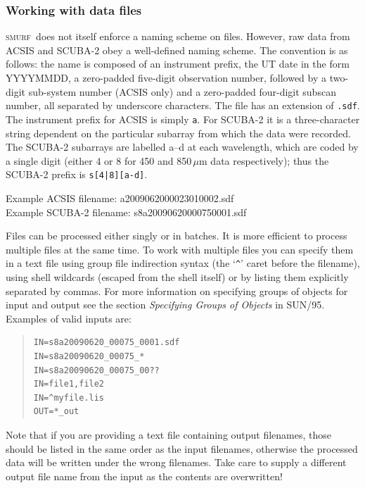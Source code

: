 \documentclass[twoside,11pt]{article}
\newcommand{\xref}[3]{#1}
\newcommand{\xlabel}[1]{}
\renewcommand{\_}{\texttt{\symbol{95}}}
\newenvironment{myquote}{\begin{quote}\begin{small}}{\end{small}\end{quote}}
\newcommand{\SMURF}{\textsc{smurf}}
\begin{document}
\subsubsection{\xlabel{files}Working with data files\label{se:files}}

\SMURF\ does not itself enforce a naming scheme on files. However, raw
data from ACSIS and SCUBA-2 obey a well-defined naming scheme. The
convention is as follows: the name is composed of an instrument
prefix, the UT date in the form YYYYMMDD, a zero-padded five-digit
observation number, followed by a two-digit sub-system number (ACSIS
only) and a zero-padded four-digit subscan number, all separated by
underscore characters. The file has an extension of \verb+.sdf+. The
instrument prefix for ACSIS is simply \verb+a+. For SCUBA-2 it is a
three-character string dependent on the particular subarray from which
the data were recorded. The SCUBA-2 subarrays are labelled a--d at
each wavelength, which are coded by a single digit (either 4 or 8 for
450 and 850\,$\mu$m data respectively); thus the SCUBA-2 prefix is
\verb+s[4|8][a-d]+.

Example ACSIS filename: a20090620\_00023\_01\_0002.sdf\\
Example SCUBA-2 filename: s8a20090620\_00075\_0001.sdf

Files can be processed either singly or in batches. It is more
efficient to process multiple files at the same time. To work with
multiple files you can specify them in a text file using group file
indirection syntax (the `\verb+^+' caret before the filename), using shell
wildcards (escaped from the shell itself) or by listing them
explicitly separated by commas. For more information on specifying
groups of objects for input and output see \xref{the section
  \textit{Specifying Groups of Objects} in
  SUN/95}{sun95}{se_groups}. Examples of valid inputs are:
\begin{myquote}
\begin{verbatim}
IN=s8a20090620_00075_0001.sdf
IN=s8a20090620_00075_*
IN=s8a20090620_00075_00??
IN=file1,file2
IN=^myfile.lis
OUT=*_out
\end{verbatim}
\end{myquote}

Note that if you are providing a text file containing output
filenames, those should be listed in the same order as the input
filenames, otherwise the processed data will be written under
the wrong filenames. Take care to supply a different output file name
from the input as the contents are overwritten!
\end{document}
